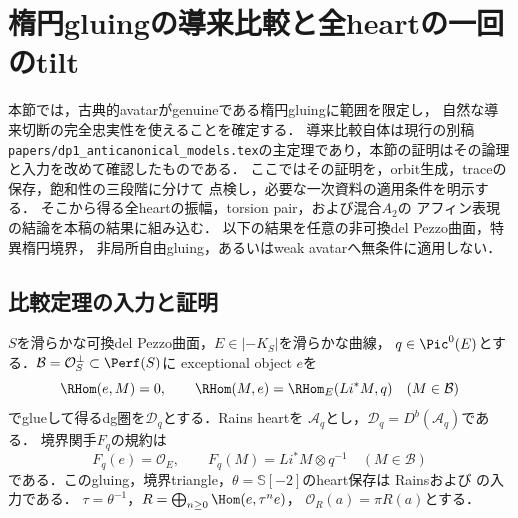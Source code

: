 \section{楕円gluingの導来比較と全heartの一回のtilt}
\label{sec:resonance-global-heart}
本節では，古典的avatarがgenuineである楕円gluingに範囲を限定し，
自然な導来切断の完全忠実性を使えることを確定する．
導来比較自体は現行の別稿
\texttt{papers/dp1\_anticanonical\_models.tex}の主定理であり，本節の証明はその論理と入力を改めて確認したものである．
ここではその証明を，orbit生成，traceの保存，飽和性の三段階に分けて
点検し，必要な一次資料の適用条件を明示する．
そこから得る全heartの振幅，torsion pair，および混合$A_2$の
アフィン表現の結論を本稿の結果に組み込む．
以下の結果を任意の非可換del Pezzo曲面，特異楕円境界，
非局所自由gluing，あるいはweak avatarへ無条件に適用しない．

\subsection{比較定理の入力と証明}
$S$を滑らかな可換del Pezzo曲面，$E\in|-K_S|$を滑らかな曲線，
$q\in\Pic^0(E)$とする．$\mathcal B=\mathcal O_S^\perp\subset\Perf(S)$に
exceptional object $e$を
\[
\RHom(e,M)=0,\qquad
\RHom(M,e)=\RHom_E(Li^*M,q)\quad(M\in\mathcal B)
\]
でglueして得るdg圏を$\mathcal D_q$とする．Rains heartを
$\mathcal A_q$とし，$\mathcal D_q=D^b(\mathcal A_q)$である．
境界関手$F_q$の規約は
\[
F_q(e)=\mathcal O_E,\qquad F_q(M)=Li^*M\otimes q^{-1}
\quad(M\in\mathcal B)
\]
である．このgluing，境界triangle，$\theta=\mathbb S[-2]$のheart保存は
Rains\cite[\S4, (4.4), (4.7)]{RainsFiltered}および
\cite[Theorem 4.30, \S5]{RainsBirational}の入力である．
$\tau=\theta^{-1}$，$R=\bigoplus_{n\ge0}\Hom(e,\tau^ne)$，
$\mathcal O_R(a)=\pi R(a)$とする．

